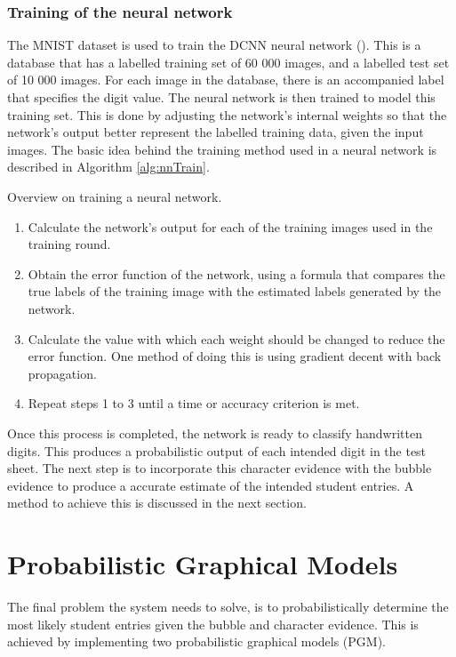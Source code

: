 \subsubsection{Training of the neural network}
\label{sec:trainNN}
The MNIST dataset is used to train the DCNN neural network (\citet{mnist}). This is a database that has a labelled training set of 60 000 images, and a labelled test set of 10 000 images. For each image in the database, there is an accompanied label that specifies the digit value. The neural network is then trained to model this training set. This is done by adjusting the network's internal weights so that the network's output better represent the labelled training data, given the input images. The basic idea behind the training method used in a neural network is described in Algorithm \ref{alg:nnTrain}.

\begin{algorithm}[H]
\caption{Overview on training a neural network.}
\label{alg:nnTrain}
\begin{enumerate}
\item Calculate the network's output for each of the training images used in the training round.
\item Obtain the error function of the network, using a formula that compares the true labels of the training image with the estimated labels generated by the network.
\item Calculate the value with which each weight should be changed to reduce the error function. One method of doing this is using gradient decent with back propagation.
\item Repeat steps 1 to 3 until a time or accuracy criterion is met.
\end{enumerate}
\end{algorithm}

Once this process is completed, the network is ready to classify handwritten digits. This produces a probabilistic output of each intended digit in the test sheet. The next step is to incorporate this character evidence with the bubble evidence to produce a accurate estimate of the intended student entries. A method to achieve this is discussed in the next section.

\section{Probabilistic Graphical Models}
\label{sec:PGM}
The final problem the system needs to solve, is to probabilistically determine the most likely student entries given the bubble and character evidence. This is achieved by implementing two probabilistic graphical models (PGM).

